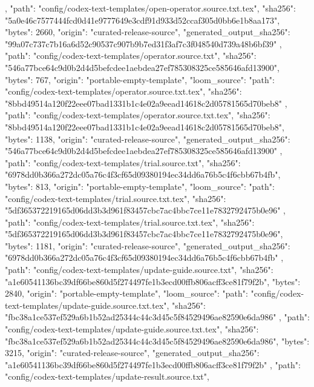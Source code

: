 {{{      }
    },
    {
      "path": "config/codex-text-templates/open-operator.source.txt.tex",
      "sha256": "5a0e46c7577444fcd0d41e9777649e3cdf91d933d52ccaf305d0bb6e1b8aa173",
      "bytes": 2660,
      "origin": "curated-release-source",
      "generated_output_sha256": "99a07c737c7b16a6d52c90537c907b9b7ed31f3af7c3f048540d739a48b6bf39"
    },
    {
      "path": "config/codex-text-templates/operator.source.txt",
      "sha256": "546a77bce64c9d0b2d4d5befcdee1aebdea27ef785308325ce585646afd13900",
      "bytes": 767,
      "origin": "portable-empty-template",
      "loom_source": {
        "path": "config/codex-text-templates/operator.source.txt.tex",
        "sha256": "8bbd49514a120f22eee07bad1331b1c4e02a9eead14618c2d05781565d70beb8"
      }
    },
    {
      "path": "config/codex-text-templates/operator.source.txt.tex",
      "sha256": "8bbd49514a120f22eee07bad1331b1c4e02a9eead14618c2d05781565d70beb8",
      "bytes": 1138,
      "origin": "curated-release-source",
      "generated_output_sha256": "546a77bce64c9d0b2d4d5befcdee1aebdea27ef785308325ce585646afd13900"
    },
    {
      "path": "config/codex-text-templates/trial.source.txt",
      "sha256": "6978dd0b366a272dc05a76c4f3cf65d09380194ec34dd6a76b5c4f6cbb67b4fb",
      "bytes": 813,
      "origin": "portable-empty-template",
      "loom_source": {
        "path": "config/codex-text-templates/trial.source.txt.tex",
        "sha256": "5df365372219165d06dd3b3d961f83457cbc7ac4bbc7ce11e7832792475b0e96"
      }
    },
    {
      "path": "config/codex-text-templates/trial.source.txt.tex",
      "sha256": "5df365372219165d06dd3b3d961f83457cbc7ac4bbc7ce11e7832792475b0e96",
      "bytes": 1181,
      "origin": "curated-release-source",
      "generated_output_sha256": "6978dd0b366a272dc05a76c4f3cf65d09380194ec34dd6a76b5c4f6cbb67b4fb"
    },
    {
      "path": "config/codex-text-templates/update-guide.source.txt",
      "sha256": "a1e60541136bc39df66be860d5f274497fe1b3ecd00ffb806acff3ce81f79f2b",
      "bytes": 2840,
      "origin": "portable-empty-template",
      "loom_source": {
        "path": "config/codex-text-templates/update-guide.source.txt.tex",
        "sha256": "fbc38a1ce537ef529a6b1b52ad25344c44c3d45c5f84529496ae82590e6da986"
      }
    },
    {
      "path": "config/codex-text-templates/update-guide.source.txt.tex",
      "sha256": "fbc38a1ce537ef529a6b1b52ad25344c44c3d45c5f84529496ae82590e6da986",
      "bytes": 3215,
      "origin": "curated-release-source",
      "generated_output_sha256": "a1e60541136bc39df66be860d5f274497fe1b3ecd00ffb806acff3ce81f79f2b"
    },
    {
      "path": "config/codex-text-templates/update-result.source.txt",
}}
